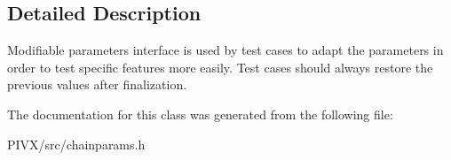 \subsection{Detailed Description}
Modifiable parameters interface is used by test cases to adapt the parameters in order to test specific features more easily. Test cases should always restore the previous values after finalization. 

The documentation for this class was generated from the following file\+:\begin{DoxyCompactItemize}
\item 
P\+I\+V\+X/src/chainparams.\+h\end{DoxyCompactItemize}

